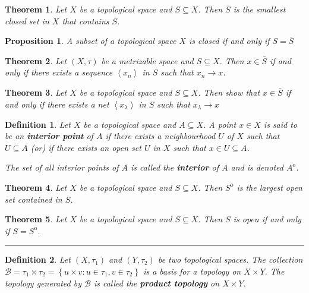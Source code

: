 \documentclass[14pt,twoside]{extreport}
\newcommand{\hhrule}{\vspace{1cm}\hrule\vspace{1cm}}
\theoremstyle{dotless}
\newtheorem*{defn}{Definition}
\newtheorem*{thm}{Theorem} %
\newtheorem*{prop}{Proposition} %
\begin{document}
\begin{thm}
    Let $X$ be a topological space and $S \subseteq X$. Then $\bar{S}$ is the smallest closed set in $X$ that contains $S$.
\end{thm}

\begin{prop}
    A subset of a topological space $X$ is closed if and only if $S = \bar{S}$
\end{prop}

\begin{thm}
    Let $\left (X, \tau\right )$ be a metrizable space and $S \subseteq X$. Then $x \in \bar{S}$ if and only if there exists a sequence $\left\langle x_n\right\rangle $ in $S$ such that $x_n \to x$.
\end{thm}

\begin{thm}
    Let $X$ be a topological space and $S \subseteq X$. Then show that $x \in \bar{S}$ if and only if there exists a net $\left\langle  x_\lambda \right\rangle $ in $S$ such that $ x_\lambda \to x$
\end{thm}

\begin{defn}
        Let $X$ be a topological space and $A \subseteq X$. A point $x \in X$ is said to be an \textbf{interior point} of $A$ if there exists a neighbourhood $U$ of $X$ such that $U \subseteq A$ (or) if there exists an open set $U$ in $X$ such that $x \in U \subseteq A$.

        The set of all interior points of $A$ is called the \textbf{interior} of $A$ and is denoted $A ^\mathrm{o}$.
\end{defn}

\begin{thm}
    Let $X$ be a topological space and $S \subseteq X$. Then $S ^\mathrm{o}$ is the largest open set contained in $S$.
\end{thm}

\begin{thm}
    Let $X$ be a topological space and $S \subseteq X$. Then $S$ is open if and only if $S = S ^\mathrm{o}$.
\end{thm}

\hhrule 

\begin{defn}
    Let $\left (X, \tau_1\right )$ and $\left (Y, \tau_2\right )$ be two topological spaces. The collection $\mathcal{B} = \tau_1 \times \tau_2 = \left\{ u \times v  :  u \in \tau_1, v \in \tau_2 \right\}$ is a basis for a topology on $X \times Y$.
    The topology generated by $\mathcal{B}$ is called the \textbf{product topology} on $X \times Y$.
\end{defn}
\end{document}
